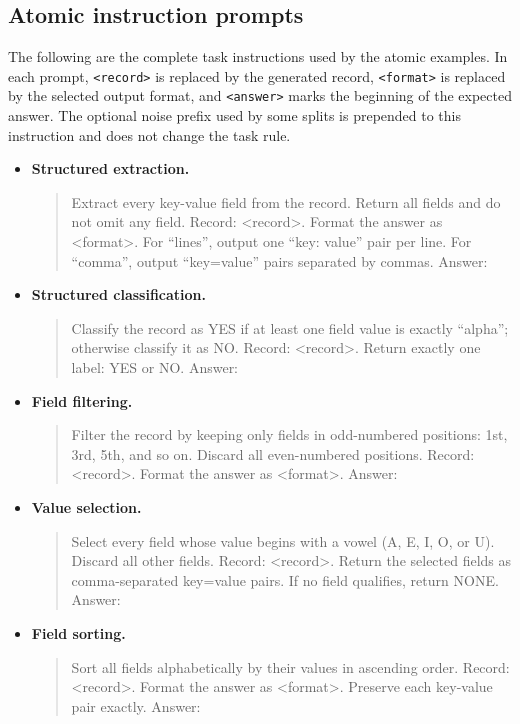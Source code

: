 \documentclass[10pt,twocolumn]{article}
\begin{document}
\subsection{Atomic instruction prompts}

The following are the complete task instructions used by the atomic examples. In each prompt, \texttt{<record>} is replaced by the generated record, \texttt{<format>} is replaced by the selected output format, and \texttt{<answer>} marks the beginning of the expected answer. The optional noise prefix used by some splits is prepended to this instruction and does not change the task rule.
\begin{itemize}
    \item \textbf{Structured extraction.} \begin{quote}\small\ttfamily Extract every key-value field from the record. Return all fields and do not omit any field. Record: <record>. Format the answer as <format>. For ``lines'', output one ``key: value'' pair per line. For ``comma'', output ``key=value'' pairs separated by commas. Answer:\end{quote}
    \item \textbf{Structured classification.} \begin{quote}\small\ttfamily Classify the record as YES if at least one field value is exactly ``alpha''; otherwise classify it as NO. Record: <record>. Return exactly one label: YES or NO. Answer:\end{quote}
    \item \textbf{Field filtering.} \begin{quote}\small\ttfamily Filter the record by keeping only fields in odd-numbered positions: 1st, 3rd, 5th, and so on. Discard all even-numbered positions. Record: <record>. Format the answer as <format>. Answer:\end{quote}
    \item \textbf{Value selection.} \begin{quote}\small\ttfamily Select every field whose value begins with a vowel (A, E, I, O, or U). Discard all other fields. Record: <record>. Return the selected fields as comma-separated key=value pairs. If no field qualifies, return NONE. Answer:\end{quote}
    \item \textbf{Field sorting.} \begin{quote}\small\ttfamily Sort all fields alphabetically by their values in ascending order. Record: <record>. Format the answer as <format>. Preserve each key-value pair exactly. Answer:\end{quote}

\end{itemize}
\end{document}
